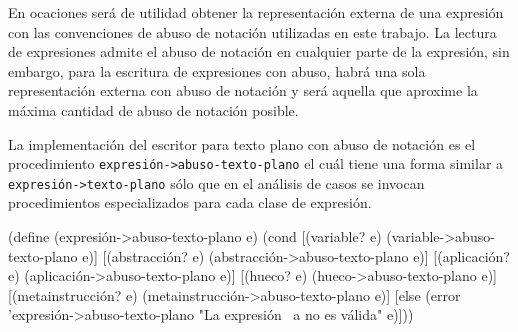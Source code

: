 \documentclass[letterpaper,twoside,openright,11pt]{book}
\begin{document}
En ocaciones será de utilidad obtener la representación externa de una expresión con las convenciones de abuso de notación utilizadas en este trabajo. La lectura de expresiones admite el abuso de notación en cualquier parte de la expresión, sin embargo, para la escritura de expresiones con abuso, habrá una sola representación externa con abuso de notación y será aquella que aproxime la máxima cantidad de abuso de notación posible.

La implementación del escritor para texto plano con abuso de notación es el procedimiento {\tt{}\protect{}expresión->abuso-texto-plano} el cuál tiene una forma similar a {\tt{}\protect{}expresión->texto-plano} sólo que en el análisis de casos se invocan procedimientos especializados para cada clase de expresión.

\nwenddocs{}\endmoddef
(define (expresión->abuso-texto-plano e)
  (cond
   [(variable? e)
    (variable->abuso-texto-plano e)]
   [(abstracción? e)
    (abstracción->abuso-texto-plano e)]
   [(aplicación? e)
    (aplicación->abuso-texto-plano e)]
   [(hueco? e)
    (hueco->abuso-texto-plano e)]
   [(metainstrucción? e)
    (metainstrucción->abuso-texto-plano e)]
   [else
    (error 'expresión->abuso-texto-plano
           "La expresión ~a no es válida" e)]))
\end{document}
